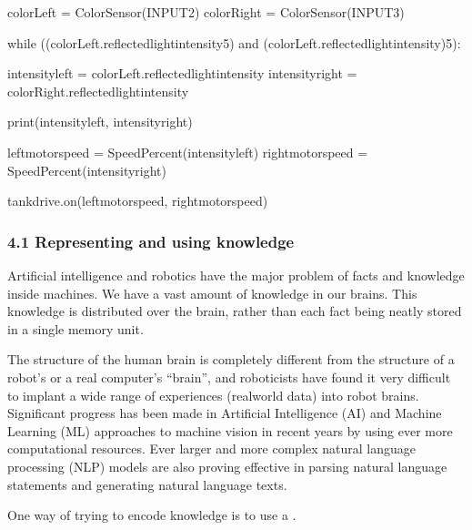 \documentclass[letterpaper,10pt,english]{sphinxmanual}
\begin{document}
{{\begin{sphinxVerbatim}[commandchars=\\\{\}]
colorLeft = ColorSensor(INPUT\PYGZus{}2)
colorRight = ColorSensor(INPUT\PYGZus{}3)

while ((colorLeft.reflected\PYGZus{}light\PYGZus{}intensity\PYGZgt{}5)
       and (colorLeft.reflected\PYGZus{}light\PYGZus{}intensity)\PYGZgt{}5):

    intensity\PYGZus{}left = colorLeft.reflected\PYGZus{}light\PYGZus{}intensity
    intensity\PYGZus{}right = colorRight.reflected\PYGZus{}light\PYGZus{}intensity

    print(intensity\PYGZus{}left, intensity\PYGZus{}right)

    left\PYGZus{}motor\PYGZus{}speed = SpeedPercent(intensity\PYGZus{}left)
    right\PYGZus{}motor\PYGZus{}speed = SpeedPercent(intensity\PYGZus{}right)

    tank\PYGZus{}drive.on(left\PYGZus{}motor\PYGZus{}speed, right\PYGZus{}motor\PYGZus{}speed)
\end{sphinxVerbatim}
}


\subsubsection{4.1 Representing and using knowledge}
\label{\detokenize{content/03_Robot_Lab/Section_00_04:4.1-Representing-and-using-knowledge}}
Artificial intelligence and robotics have the major problem of  facts and knowledge inside machines. We have a vast amount of knowledge in our brains. This knowledge is distributed over the brain, rather than each fact being neatly stored in a single memory unit.

The structure of the human brain is completely different from the structure of a robot’s or a real computer’s “brain”, and roboticists have found it very difficult to implant a wide range of experiences (real\sphinxhyphen{}world data) into robot brains. Significant progress has been made in Artificial Intelligence (AI) and Machine Learning (ML) approaches to machine vision in recent years by using ever more computational resources. Ever larger and more complex natural language processing (NLP) models are also
proving effective in parsing natural language statements and generating natural language texts.

One way of  trying to encode knowledge is to use a .


}
\end{document}
